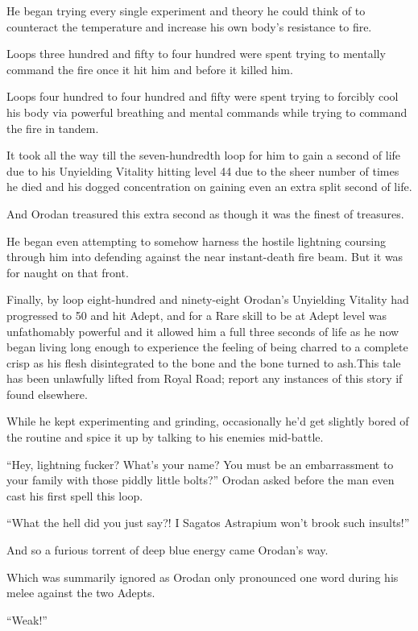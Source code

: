 \documentclass[a4paper,10pt]{book}
\begin{document}
He began trying every single experiment and theory he could think of to counteract the temperature and increase his own body’s resistance to fire.\par
Loops three hundred and fifty to four hundred were spent trying to mentally command the fire once it hit him and before it killed him.\par
Loops four hundred to four hundred and fifty were spent trying to forcibly cool his body via powerful breathing and mental commands while trying to command the fire in tandem.\par
It took all the way till the seven-hundredth loop for him to gain a second of life due to his Unyielding Vitality hitting level 44 due to the sheer number of times he died and his dogged concentration on gaining even an extra split second of life.\par
And Orodan treasured this extra second as though it was the finest of treasures.\par
He began even attempting to somehow harness the hostile lightning coursing through him into defending against the near instant-death fire beam. But it was for naught on that front.\par
Finally, by loop eight-hundred and ninety-eight Orodan’s Unyielding Vitality had progressed to 50 and hit Adept, and for a Rare skill to be at Adept level was unfathomably powerful and it allowed him a full three seconds of life as he now began living long enough to experience the feeling of being charred to a complete crisp as his flesh disintegrated to the bone and the bone turned to ash.This tale has been unlawfully lifted from Royal Road; report any instances of this story if found elsewhere.\par
While he kept experimenting and grinding, occasionally he’d get slightly bored of the routine and spice it up by talking to his enemies mid-battle.\par
“Hey, lightning fucker? What’s your name? You must be an embarrassment to your family with those piddly little bolts?” Orodan asked before the man even cast his first spell this loop.\par
“What the hell did you just say?! I Sagatos Astrapium won’t brook such insults!”\par
And so a furious torrent of deep blue energy came Orodan’s way.\par
Which was summarily ignored as Orodan only pronounced one word during his melee against the two Adepts.\par
“Weak!”\par
\end{document}
